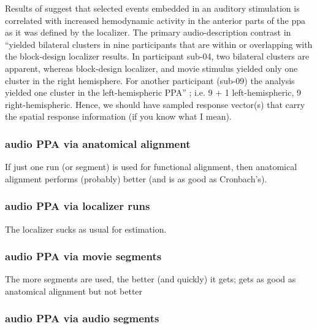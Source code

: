 
%
Results of \citet{haeusler2022processing} suggest that selected events embedded
in an auditory stimulation is correlated with increased hemodynamic activity in
the anterior parts of the \ac{ppa} as it was defined by the localizer.
%
The primary audio-description contrast in \citet{haeusler2022processing}
``yielded bilateral clusters in nine participants that are within or overlapping
with the block-design localizer results. In participant sub-04, two bilateral
clusters are apparent, whereas block-design localizer, and movie stimulus
yielded only one cluster in the right hemisphere.  For another participant
(sub-09) the analysis yielded one cluster in the left-hemispheric PPA''
\citep{haeusler2022processing};
i.e. 9 + 1 left-hemispheric, 9 right-hemispheric.
%
Hence, we should have sampled response vector(s) that carry the spatial response
information (if you know what I mean).



\subsubsection{audio PPA via anatomical alignment}

If just one run (or segment) is used for functional alignment, then anatomical
alignment performs (probably) better (and is as good as Cronbach's).


\subsubsection{audio PPA via localizer runs}


%
The localizer sucks as usual for estimation.


\subsubsection{audio PPA via movie segments}


The more segments are used, the better (and quickly) it gets; gets as good as
anatomical alignment but not better


\subsubsection{audio PPA via audio segments}

